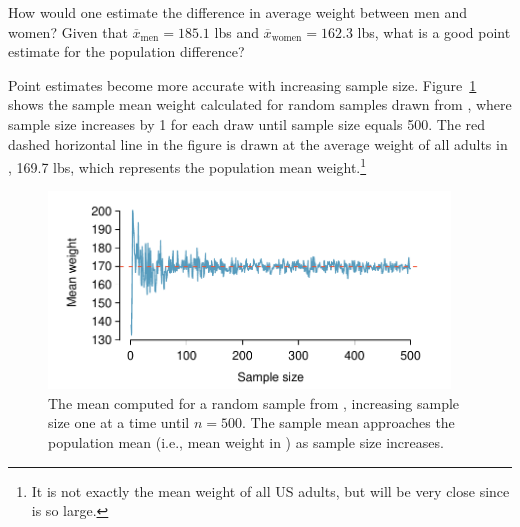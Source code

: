 \begin{exercisewrap}
\begin{nexercise}\label{peOfDiffWeightBetweenGender}%
How would one estimate the difference in average weight between men and women? Given that $\overline{x}_{\text{men}} = 185.1$ lbs and $\overline{x}_{\text{women}} = 162.3$ lbs, what is a good point estimate for the population difference?\footnotemark{}
\end{nexercise}
\end{exercisewrap}

Point estimates become more accurate with increasing sample size. Figure~\ref{cdcWeightRunningMean} shows the sample mean weight calculated for random samples drawn from , where sample size increases by 1 for each draw until sample size equals 500. The red dashed horizontal line in the figure is drawn at the average weight of all adults in , 169.7 lbs, which represents the population mean weight.\footnote{It is not exactly the mean weight of all US adults, but will be very close since  is so large.}

\begin{figure}[h]
	\centering
	\includegraphics[width=0.95\textwidth]{ch_03a_inference_foundations_oi_biostat/figures/cdcWeightRunningMean/cdcWeightRunningMeanNew.pdf}
	\caption{The mean  computed for a random sample from , increasing sample size one at a time until $n = 500$. The sample mean approaches the population mean (i.e., mean weight in ) as sample size increases.}
	\label{cdcWeightRunningMean}
\end{figure}

